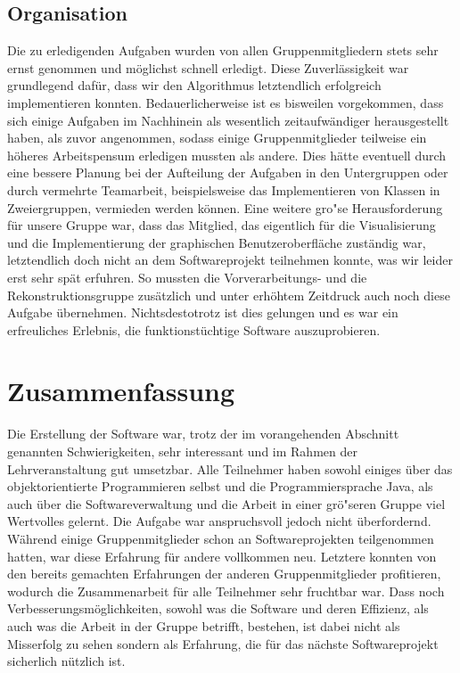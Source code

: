 \documentclass[parskip=half,
 fontsize=12pt, bibtotoc,
 titlepage, ngerman]
 {article}
\begin{document}
\subsection*{Organisation}
Die zu erledigenden Aufgaben wurden von allen Gruppenmitgliedern stets sehr ernst genommen und möglichst schnell erledigt. Diese Zuverlässigkeit war grundlegend dafür, dass wir den Algorithmus letztendlich erfolgreich implementieren konnten. Bedauerlicherweise ist es bisweilen vorgekommen, dass sich einige Aufgaben im Nachhinein als wesentlich zeitaufwändiger herausgestellt haben, als zuvor angenommen, sodass einige Gruppenmitglieder teilweise ein höheres Arbeitspensum erledigen mussten als andere. Dies hätte eventuell durch eine bessere Planung bei der Aufteilung der Aufgaben in den Untergruppen oder durch vermehrte Teamarbeit, beispielsweise das Implementieren von Klassen in Zweiergruppen, vermieden werden können.\newline
Eine weitere gro"se Herausforderung für unsere Gruppe war, dass das Mitglied, das eigentlich für die Visualisierung und die Implementierung der graphischen Benutzeroberfläche zuständig war, letztendlich doch nicht an dem Softwareprojekt teilnehmen konnte, was wir leider erst sehr spät erfuhren. So mussten die Vorverarbeitungs- und die Rekonstruktionsgruppe zusätzlich und unter erhöhtem Zeitdruck auch noch diese Aufgabe übernehmen. Nichtsdestotrotz ist dies gelungen und es war ein erfreuliches Erlebnis, die funktionstüchtige Software auszuprobieren.

\section{Zusammenfassung}
Die Erstellung der Software war, trotz der im vorangehenden Abschnitt genannten Schwierigkeiten, sehr interessant und im Rahmen der Lehrveranstaltung gut umsetzbar. Alle Teilnehmer haben sowohl einiges über das objektorientierte Programmieren selbst und die Programmiersprache Java, als auch über die Softwareverwaltung und die Arbeit in einer grö"seren Gruppe viel Wertvolles gelernt. Die Aufgabe war anspruchsvoll jedoch nicht überfordernd. Während einige Gruppenmitglieder schon an Softwareprojekten teilgenommen hatten, war diese Erfahrung für andere vollkommen neu. Letztere konnten von den bereits gemachten Erfahrungen der anderen Gruppenmitglieder profitieren, wodurch die Zusammenarbeit für alle Teilnehmer sehr fruchtbar war. Dass noch Verbesserungsmöglichkeiten, sowohl was die Software und deren Effizienz, als auch was die Arbeit in der Gruppe betrifft, bestehen, ist dabei nicht als Misserfolg zu sehen sondern als Erfahrung, die für das nächste Softwareprojekt sicherlich nützlich ist. 
\printbibliography
\end{document}
